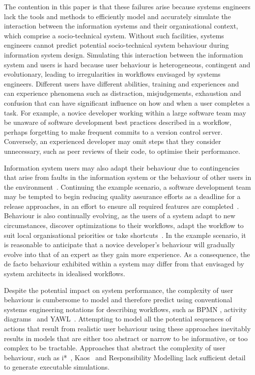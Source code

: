 \documentclass{llncs}
\begin{document}
The contention in this paper is that these failures arise because systems engineers lack the tools and methods to
efficiently model and accurately simulate the interaction between the information systems and their organisational
context, which comprise a socio-technical system. Without such facilities, systems engineers cannot predict potential
socio-technical system behaviour during information system design. Simulating this interaction between the information
system and users is hard because user behaviour is heterogeneous, contingent and evolutionary, leading to irregularities
in workflows envisaged by systems engineers.  Different users have different abilities, training and experiences and can
experience phenomena such as distraction, misjudgements, exhaustion and confusion that can have significant influence on
how and when a user completes a task.  For example, a novice developer working within a large software team may be
unaware of software development best practices described in a workflow, perhaps forgetting to make frequent commits to a
version control server.  Conversely, an experienced developer may omit steps that they consider unnecessary, such as
peer reviews of their code, to optimise their performance.

Information system users may also adapt their behaviour due to contingencies that arise from faults in the information
system or the behaviour of other users in the environment~\citep{sommerville09deriving}.  Continuing the example
scenario, a software development team may be tempted to begin reducing quality assurance efforts as a deadline for a
release approaches, in an effort to ensure all required features are completed~\citep{beck02test}. Behaviour is also
continually evolving, as the users of a system adapt to new circumstances, discover optimizations to their
workflows, adapt the workflow to suit local organisational priorities or take shortcuts~\citep{bonen79evolutionary}.  In
the example scenario, it is reasonable to anticipate that a novice developer's behaviour will gradually evolve into that
of an expert as they gain more experience.  As a consequence, the de facto behaviour exhibited within a system may
differ from that envisaged by system architects in idealised workflows.

Despite the potential impact on system performance, the complexity of user behaviour is cumbersome to model and
therefore predict using conventional systems engineering notations for describing workflows, such as BPMN
\citep{omg2011omgbpmn}, activity diagrams~\citep{omg07omguml} and YAWL~\citep{hofstede2010yawl}.
Attempting to model all the potential sequences of actions that result
from realistic user behaviour using these approaches inevitably results in models that are either too abstract or narrow
to be informative, or too complex to be tractable.  Approaches that abstract the complexity of user behaviour, such as
i*~\citep{yu1995social}, Kaos~\citep{werneck2009goreistarkaos} and Responsibility Modelling
\citep{sommerville09deriving} lack sufficient detail to generate executable simulations.
\end{document}
